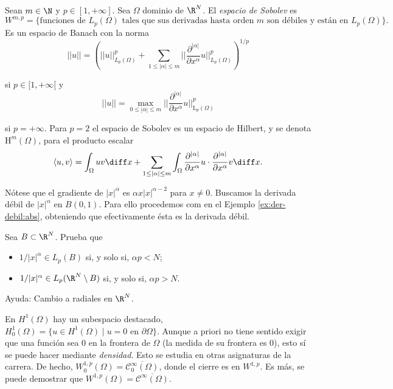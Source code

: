 \documentclass{article}
\begin{document}
\begin{definition}
  Sean $m \in \N$ y $p \in [1,+\infty]$. Sea $\Omega$ dominio de $\R^N$. El \emph{espacio de
    Sobolev} es
  \[ W^{m,p} = \{\text{funciones de } L_p(\Omega) \text{ tales que sus derivadas hasta orden } m
    \text{ son débiles y están en } L_p(\Omega) \}. \] Es un espacio de Banach con la norma
  \[ ||u|| = \left( ||u||^p_{L_p(\Omega)} + \sum_{1 \le |\alpha| \le m}
      ||\frac{\partial^{|\alpha|}}{\partial x^{\alpha}} u ||^p_{L_p(\Omega)} \right)^{1/p} \]

  si $p \in [1, +\infty[$ y
  \[ ||u|| = \max_{0 \le |\alpha| \le m} ||\frac{\partial^{|\alpha|}}{\partial x^{\alpha}} u
    ||^p_{\mathrm{L}_p(\Omega)} \]

  si $p = +\infty$. Para $p = 2$ el espacio de Sobolev es un espacio de Hilbert, y se denota
  $\mathrm{H}^m(\Omega)$, para el producto escalar
  \[ \left\langle u, v \right\rangle = \int_{\Omega} uv \diff x + \sum_{1 \le |\alpha| \le m}
    \int_{\Omega} \frac{\partial^{|\alpha|}}{\partial x^{\alpha}} u \cdot
    \frac{\partial^{|\alpha|}}{\partial x^{\alpha}} v \diff x.\]
\end{definition}

\begin{ex} 
  Nótese que el gradiente de $|x|^{\alpha}$ es $\alpha x |x|^{\alpha-2}$ para $x \ne 0$. Buscamos la
  derivada débil de $|x|^{\alpha}$ en $B(0,1)$. Para ello procedemos com en el Ejemplo
  \ref{ex:der-debil:abs}, obteniendo que efectivamente ésta es la derivada débil.
\end{ex}

\begin{ex}
  Sea $B \subset \R^N$. Prueba que
  \begin{itemize}
  \item $1/|x|^{\alpha} \in L_p(B)$ si, y solo si, $\alpha p < N$;
  \item $1/|x|^{\alpha} \in L_p(\R^N \setminus B)$ si, y solo si, $\alpha p > N$.
  \end{itemize}
  Ayuda: Cambio a radiales en $\R^N$.
\end{ex}

En $H^1(\Omega)$ hay un subespacio destacado,
$H_0^1(\Omega) = \{u \in H^1(\Omega) \mid u = 0 \text{ en } \partial \Omega\}$. Aunque a priori no
tiene sentido exigir que una función sea $0$ en la frontera de $\Omega$ (la medida de su frontera es
$0$), esto sí se puede hacer mediante \emph{densidad}. Esto se estudia en otras asignaturas de la
carrera. De hecho, $W_0^{1,p} (\Omega) = \overline{\mathcal{C}_0^\infty(\Omega)}$, donde el cierre
es en $W^{1,p}$. Es más, se puede demostrar que
$W^{1,p} (\Omega) = \overline{\mathcal{C}^\infty(\Omega)}$.
\end{document}
